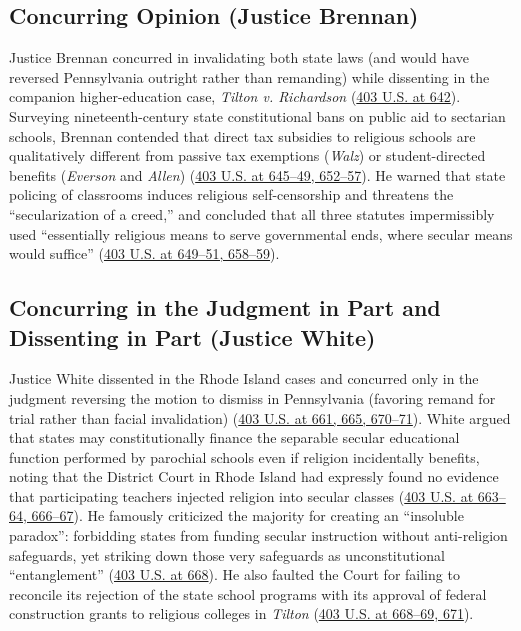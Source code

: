 \documentclass[12pt]{article}
\begin{document}
\subsection{Concurring Opinion (Justice Brennan)}
Justice Brennan concurred in invalidating both state laws (and would have reversed Pennsylvania outright rather than remanding) while dissenting in the companion higher-education case, \textit{Tilton v. Richardson} (\href{https://supreme.justia.com/cases/federal/us/403/602/}{403 U.S. at 642}). Surveying nineteenth-century state constitutional bans on public aid to sectarian schools, Brennan contended that direct tax subsidies to religious schools are qualitatively different from passive tax exemptions (\textit{Walz}) or student-directed benefits (\textit{Everson} and \textit{Allen}) (\href{https://supreme.justia.com/cases/federal/us/403/602/}{403 U.S. at 645--49, 652--57}). He warned that state policing of classrooms induces religious self-censorship and threatens the ``secularization of a creed,'' and concluded that all three statutes impermissibly used ``essentially religious means to serve governmental ends, where secular means would suffice'' (\href{https://supreme.justia.com/cases/federal/us/403/602/}{403 U.S. at 649--51, 658--59}).

\subsection{Concurring in the Judgment in Part and Dissenting in Part (Justice White)}
Justice White dissented in the Rhode Island cases and concurred only in the judgment reversing the motion to dismiss in Pennsylvania (favoring remand for trial rather than facial invalidation) (\href{https://supreme.justia.com/cases/federal/us/403/602/}{403 U.S. at 661, 665, 670--71}). White argued that states may constitutionally finance the separable secular educational function performed by parochial schools even if religion incidentally benefits, noting that the District Court in Rhode Island had expressly found no evidence that participating teachers injected religion into secular classes (\href{https://supreme.justia.com/cases/federal/us/403/602/}{403 U.S. at 663--64, 666--67}). He famously criticized the majority for creating an ``insoluble paradox'': forbidding states from funding secular instruction without anti-religion safeguards, yet striking down those very safeguards as unconstitutional ``entanglement'' (\href{https://supreme.justia.com/cases/federal/us/403/602/}{403 U.S. at 668}). He also faulted the Court for failing to reconcile its rejection of the state school programs with its approval of federal construction grants to religious colleges in \textit{Tilton} (\href{https://supreme.justia.com/cases/federal/us/403/602/}{403 U.S. at 668--69, 671}).
\end{document}
